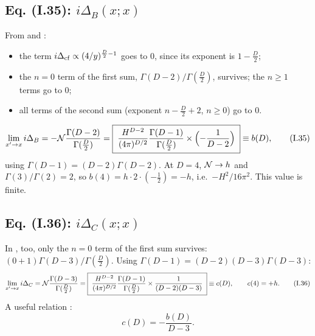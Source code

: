 \subsection{Eq. (I.35): \texorpdfstring{$i\Delta_B(x;x)$}{iDeltaB(x;x)} \texorpdfstring{\tD}{}}
From  and :
\begin{itemize}
\item the term \(i\Delta_{\rm cf}\propto(4/y)^{\frac D2-1}\) goes to \(0\), since its exponent is
\(1-\tfrac D2\);
\item the \(n=0\) term of the first sum, \(\Gamma(D-2)/\Gamma(\tfrac D2)\), survives; the
\(n\ge1\) terms go to \(0\);
\item all terms of the second sum (exponent \(n-\tfrac D2+2\), \(n\ge0\)) go to \(0\).
\end{itemize}
\begin{equation*}\label{eq:t4-I35}
\lim_{x'\to x}i\Delta_B=-\mathcal N\frac{\Gamma(D-2)}{\Gamma(\frac D2)}
=\boxed{\;\frac{H^{D-2}}{(4\pi)^{D/2}}\frac{\Gamma(D-1)}{\Gamma(\frac D2)}\times\Bigl(-\frac1{D-2}\Bigr)\;}\equiv b(D),
\tag{I.35}
\end{equation*}
using \(\Gamma(D-1)=(D-2)\Gamma(D-2)\). At \(D=4\), \(\mathcal N\to h\) and \(\Gamma(3)/\Gamma(2)=2\), so
\(b(4)=h\cdot2\cdot(-\tfrac12)=-h\), i.e.\ \(-H^2/16\pi^2\). This value is finite.

\subsection{Eq. (I.36): \texorpdfstring{$i\Delta_C(x;x)$}{iDeltaC(x;x)} \texorpdfstring{\tD}{}}
In , too, only the \(n=0\) term of the first sum survives:
\((0+1)\Gamma(D-3)/\Gamma(\frac D2)\). Using \(\Gamma(D-1)=(D-2)(D-3)\Gamma(D-3)\):
\begin{equation*}\label{eq:t4-I36}
\lim_{x'\to x}i\Delta_C=\mathcal N\frac{\Gamma(D-3)}{\Gamma(\frac D2)}
=\boxed{\;\frac{H^{D-2}}{(4\pi)^{D/2}}\frac{\Gamma(D-1)}{\Gamma(\frac D2)}\times\frac1{(D-2)(D-3)}\;}\equiv c(D),\qquad c(4)=+h.
\tag{I.36}
\end{equation*}
A useful relation \tD:
\begin{equation}\label{eq:t4-cb}
c(D)=-\frac{b(D)}{D-3}.
\end{equation}

